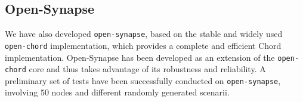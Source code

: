 \subsection{Open-Synapse}
%
We have also developed {\tt open-synapse}, based on the stable and
widely used {\tt open-chord} implementation, which provides a complete
and efficient Chord implementation. Open-Synapse has been developed as
an extension of the {\tt open-chord} core and thus takes advantage of
its robustness and reliability. A preliminary set of tests have been
successfully conducted on {\tt open-synapse}, involving $50$ nodes and
different randomly generated scenarii.
